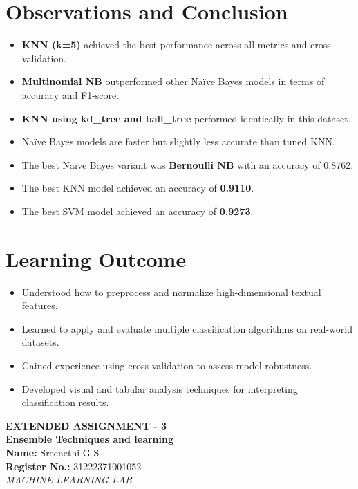 \documentclass[12pt]{article}
\begin{document}
\newpage
\section*{Observations and Conclusion}
\begin{itemize}
  \item \textbf{KNN (k=5)} achieved the best performance across all metrics and cross-validation.
  \item \textbf{Multinomial NB} outperformed other Naïve Bayes models in terms of accuracy and F1-score.
  \item \textbf{KNN using kd\_tree and ball\_tree} performed identically in this dataset.
  \item Naïve Bayes models are faster but slightly less accurate than tuned KNN.
  \item The best Naïve Bayes variant was \textbf{Bernoulli NB} with an accuracy of 0.8762.
  \item The best KNN model achieved an accuracy of \textbf{0.9110}.
  \item The best SVM model achieved an accuracy of \textbf{0.9273}.
\end{itemize}


\section*{Learning Outcome}
\begin{itemize}
  \item Understood how to preprocess and normalize high-dimensional textual features.
  \item Learned to apply and evaluate multiple classification algorithms on real-world datasets.
  \item Gained experience using cross-validation to assess model robustness.
  \item Developed visual and tabular analysis techniques for interpreting classification results.
\end{itemize}

\newpage
\begin{titlepage}
    \centering
    \vspace*{3cm}
    
    {\LARGE \textbf{EXTENDED ASSIGNMENT - 3}}\\[1.5cm]
    
    {\Large \textbf{Ensemble Techniques and learning}}\\[2cm]
    
    {\large \textbf{Name:} Sreenethi G S}\\[0.4cm]
    {\large \textbf{Register No.:} 31222371001052}\\[0.4cm]
    
    {\large \textit{MACHINE LEARNING LAB}}\\[6cm]
    
    \vfill
\end{titlepage}
\end{document}
